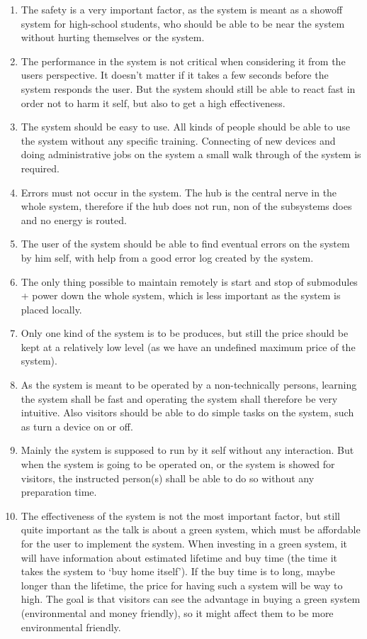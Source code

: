 \begin{enumerate}
	\item The safety is a very important factor, as the system is meant as a showoff system for high-school students, who should be able to be near the system without hurting themselves or the system.
	\item The performance in the system is not critical when considering it from the users perspective. It doesn't matter if it takes a few seconds before the system responds the user. But the system should still be able to react fast in order not to harm it self, but also to get a high effectiveness. 
	\item The system should be easy to use. All kinds of people should be able to use the system without any specific training. Connecting of new devices and doing administrative jobs on the system a small walk through of the system is required. 
	\item Errors must not occur in the system. The hub is the central nerve in the whole system, therefore if the hub does not run, non of the subsystems does and no energy is routed.
	\item The user of the system should be able to find eventual errors on the system by him self, with help from a good error log created by the system.
	\item The only thing possible to maintain remotely is start and stop of submodules + power down the whole system, which is less important as the system is placed locally.
	\item Only one kind of the system is to be produces, but still the price should be kept at a relatively low level (as we have an undefined maximum price of the system).
	\item As the system is meant to be operated by a non-technically persons, learning the system shall be fast and operating the system shall therefore be very intuitive. Also visitors should be able to do simple tasks on the system, such as turn a device on or off.
	\item Mainly the system is supposed to run by it self without any interaction. But when the system is going to be operated on, or the system is showed for visitors, the instructed person(s) shall be able to do so without any preparation time.
	\item The effectiveness of the system is not the most important factor, but still quite important as the talk is about a green system, which must be
	affordable for the user to implement the system. When investing in a green system, it will have information about estimated lifetime and buy time (the time it takes the system to `buy home itself'). If the buy time is to long, maybe longer than the lifetime, the price for having such a system will be way to high. The goal is that visitors can see the advantage in buying a green system (environmental and money friendly), so it might affect them to be more environmental friendly. 

\end{enumerate}
